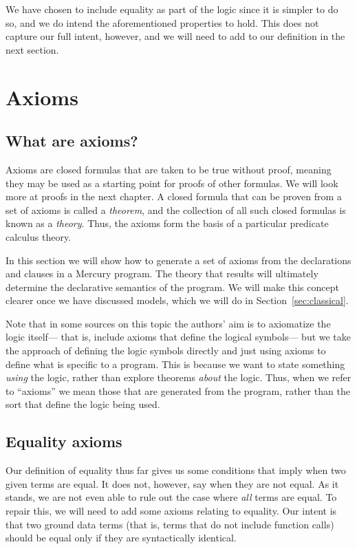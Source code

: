 We have chosen to include equality as part of the logic
since it is simpler to do so,
and we do intend the aforementioned properties to hold.
This does not capture our full intent, however,
and we will need to add to our definition in the next section.


\section{Axioms}
\label{sec:axioms}

\subsection{What are axioms?}
\label{gi:axiom}

Axioms are closed formulas that are taken to be true without proof,
meaning they may be used as a starting point for
proofs of other formulas.
We will look more at proofs in the next chapter.
A closed formula that can be proven from a set of axioms
is called a \emph{theorem\label{gi:theorem}},
and the collection of all such closed formulas
is known as a \emph{theory}.
Thus, the axioms form the basis of
a particular predicate calculus theory.

In this section we will show how to generate a set of axioms
from the declarations and clauses in a Mercury program.
The theory that results will ultimately determine
the declarative semantics of the program.
We will make this concept clearer
once we have discussed models,
which we will do in Section~\ref{sec:classical}.

Note that in some sources on this topic
the authors' aim is to axiomatize the logic itself---%
that is, include axioms that define the logical symbols---%
but we take the approach of defining the logic symbols directly
and just using axioms to define what is specific to a program.
This is because we want to state something \emph{using} the logic,
rather than explore theorems \emph{about} the logic.
Thus, when we refer to ``axioms''
we mean those that are generated from the program,
rather than the sort that define the logic being used.


\subsection{Equality axioms}
\label{sec:ax-equality}

Our definition of equality thus far
gives us some conditions that imply when two given terms are equal.
It does not, however, say when they are not equal.
As it stands,
we are not even able to rule out the case where
\emph{all} terms are equal.
To repair this,
we will need to add some axioms relating to equality.
Our intent is that two ground data terms\label{gi:data-term}
(that is, terms that do not include function calls)
should be equal only if they are syntactically identical.

